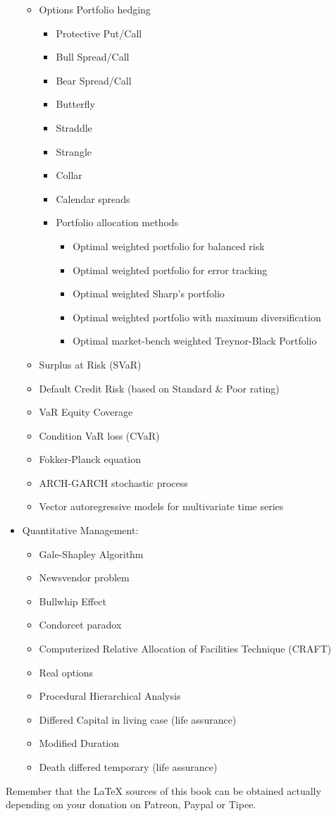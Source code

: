 \begin{itemize}
\begin{itemize}
				\item Options Portfolio hedging
				\begin{itemize}
					\item Protective Put/Call
					\item Bull Spread/Call
					\item Bear Spread/Call
					\item Butterfly
					\item Straddle
					\item Strangle
					\item Collar
					\item Calendar spreads
					\item Portfolio allocation methods
					\begin{itemize}
						\item Optimal weighted portfolio for balanced risk 
						\item Optimal weighted portfolio for error tracking
						\item Optimal weighted Sharp's portfolio
						\item Optimal weighted portfolio with maximum diversification
						\item Optimal market-bench weighted Treynor-Black Portfolio
					\end{itemize}
				\end{itemize}
				\item Surplus at Risk (SVaR)
				\item Default Credit Risk (based on Standard \& Poor rating)
				\item VaR Equity Coverage
				\item Condition VaR loss (CVaR)
				\item Fokker-Planck equation
				\item ARCH-GARCH stochastic process
				\item Vector autoregressive models for multivariate time series
			\end{itemize}	
		\item Quantitative Management: 
			\begin{itemize}
				\item Gale-Shapley Algorithm
				\item Newsvendor problem
				\item Bullwhip Effect
				\item Condorcet paradox	
				\item Computerized Relative Allocation of Facilities Technique (CRAFT)			
				\item Real options
				\item Procedural Hierarchical Analysis
				\item Differed Capital in living case (life assurance)
				\item Modified Duration
				\item Death differed temporary (life assurance)
			\end{itemize}	
	\end{itemize}
	Remember that the \LaTeX{} sources of this book can be obtained actually depending on your donation on Patreon, Paypal or Tipee.
	
